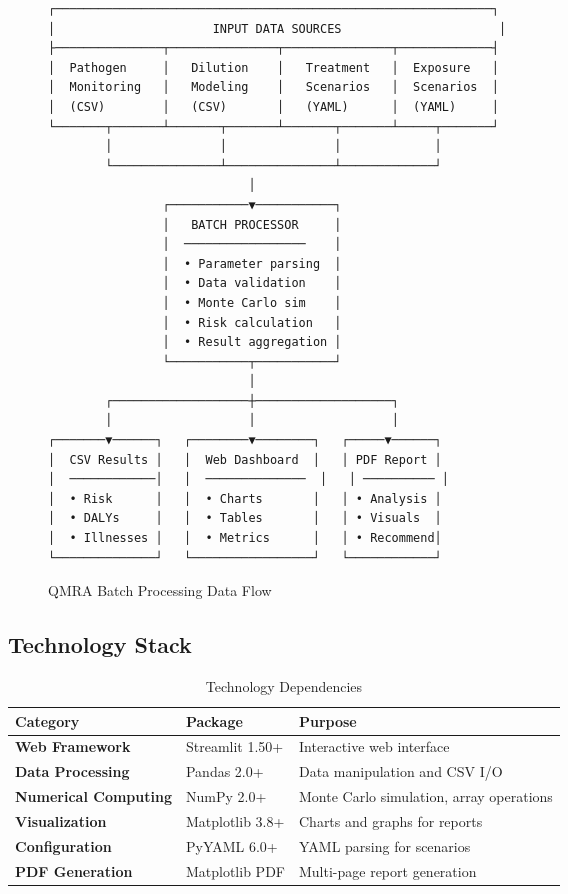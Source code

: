 \documentclass[11pt,a4paper]{article}
\begin{document}
\begin{figure}[H]
\centering
\begin{verbatim}
┌─────────────────────────────────────────────────────────────┐
│                      INPUT DATA SOURCES                      │
├───────────────┬───────────────┬───────────────┬─────────────┤
│  Pathogen     │   Dilution    │   Treatment   │  Exposure   │
│  Monitoring   │   Modeling    │   Scenarios   │  Scenarios  │
│  (CSV)        │   (CSV)       │   (YAML)      │  (YAML)     │
└───────┬───────┴───────┬───────┴───────┬───────┴─────┬───────┘
        │               │               │             │
        └───────────────┴───────────────┴─────────────┘
                            │
                ┌───────────▼───────────┐
                │   BATCH PROCESSOR     │
                │  ─────────────────    │
                │  • Parameter parsing  │
                │  • Data validation    │
                │  • Monte Carlo sim    │
                │  • Risk calculation   │
                │  • Result aggregation │
                └───────────┬───────────┘
                            │
        ┌───────────────────┼───────────────────┐
        │                   │                   │
┌───────▼──────┐   ┌────────▼────────┐   ┌─────▼──────┐
│  CSV Results │   │  Web Dashboard  │   │ PDF Report │
│  ────────────│   │  ──────────────  │   │ ────────── │
│  • Risk      │   │  • Charts       │   │ • Analysis │
│  • DALYs     │   │  • Tables       │   │ • Visuals  │
│  • Illnesses │   │  • Metrics      │   │ • Recommend│
└──────────────┘   └─────────────────┘   └────────────┘
\end{verbatim}
\caption{QMRA Batch Processing Data Flow}
\end{figure}

\subsection{Technology Stack}

\begin{table}[H]
\centering
\caption{Technology Dependencies}
\begin{tabular}{>{\bfseries}p{3cm}p{3cm}p{7cm}}
\toprule
Category & Package & Purpose \\
\midrule
Web Framework & Streamlit 1.50+ & Interactive web interface \\
Data Processing & Pandas 2.0+ & Data manipulation and CSV I/O \\
Numerical Computing & NumPy 2.0+ & Monte Carlo simulation, array operations \\
Visualization & Matplotlib 3.8+ & Charts and graphs for reports \\
Configuration & PyYAML 6.0+ & YAML parsing for scenarios \\
PDF Generation & Matplotlib PDF & Multi-page report generation \\
\bottomrule
\end{tabular}
\end{table}
\end{document}
